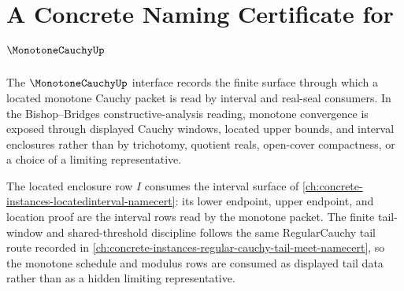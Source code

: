 \chapter{A Concrete Naming Certificate for $\MonotoneCauchyUp$}
\label{ch:concrete-instances-monotonecauchy-namecert}

The $\MonotoneCauchyUp$ interface records the finite surface through which a located monotone Cauchy packet is read by interval and real-seal consumers. In the Bishop--Bridges constructive-analysis reading, monotone convergence is exposed through displayed Cauchy windows, located upper bounds, and interval enclosures rather than by trichotomy, quotient reals, open-cover compactness, or a choice of a limiting representative.

The located enclosure row $I$ consumes the interval surface of \autoref{ch:concrete-instances-locatedinterval-namecert}: its lower endpoint, upper endpoint, and location proof are the interval rows read by the monotone packet. The finite tail-window and shared-threshold discipline follows the same RegularCauchy tail route recorded in \autoref{ch:concrete-instances-regular-cauchy-tail-meet-namecert}, so the monotone schedule and modulus rows are consumed as displayed tail data rather than as a hidden limiting representative.

